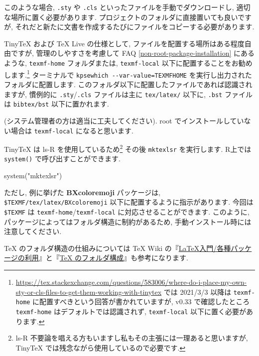 \documentclass[
  xelatex,ja=standard,jafont=noto]{bxjsreport}
\newenvironment{Shaded}{\begin{snugshade}}{\end{snugshade}}
\newcommand{\FunctionTok}[1]{\textcolor[rgb]{0.00,0.00,0.00}{#1}}
\newcommand{\NormalTok}[1]{#1}
\newcommand{\StringTok}[1]{\textcolor[rgb]{0.31,0.60,0.02}{#1}}
\begin{document}
このような場合, \texttt{.sty} や \texttt{.cls}
といったファイルを手動でダウンロードし, 適切な場所に置く必要があります.
プロジェクトのフォルダに直接置いても良いですが,
それだと新たに文書を作成するたびにファイルをコピーする必要があります.

TinyTeX および TeX Live の仕様として,
ファイルを配置する場所はある程度自由ですが, 管理のしやすさを考慮して FAQ
\ref{non-root-package-installation} にあるような, \texttt{texmf-home}
フォルダまたは, \texttt{texmf-local}
以下に配置することをお勧めします.\footnote{\url{https://tex.stackexchange.com/questions/583006/where-do-i-place-my-own-sty-or-cls-files-to-get-them-working-with-tinytex}
  では 2021/3/3 以降は \texttt{texmf-home}
  に配置すべきという回答が書かれていますが, v0.33 で確認したところ
  \texttt{texmf-home} はデフォルトでは認識されず, \texttt{texmf-local}
  以下に置く必要があります.} ターミナルで
\texttt{kpsewhich\ -\/-var-value=TEXMFHOME}
を実行し出力されたフォルダに配置します.
このフォルダ以下に配置したファイルであれば認識されますが, 慣例的に
\texttt{.sty}/\texttt{.cls} ファイルは主に \texttt{tex/latex/} 以下に,
\texttt{.bst} ファイルは \texttt{bibtex/bst} 以下に置かれます.

(システム管理者の方は適当に工夫してください). root
でインストールしていない場合は \texttt{texmf-local} になると思います.

TinyTeX は ls-R を使用しているため\footnote{ls-R
  不要論を唱える方もいますし私もその主張には一理あると思いますが,
  TinyTeX では残念ながら使用しているので必要です.} その後
\texttt{mktexlsr} を実行します. R上では \texttt{system()}
で呼び出すことができます.

\begin{Shaded}
\begin{Highlighting}[numbers=left,,]
\FunctionTok{system}\NormalTok{(}\StringTok{"mktexlsr"}\NormalTok{)}
\end{Highlighting}
\end{Shaded}

ただし, 例に挙げた \textbf{BXcoloremoji} パッケージは,
\texttt{\$TEXMF/tex/latex/BXcoloremoji}
以下に配置するように指示があります. 今回は \texttt{\$TEXMF} は
\texttt{texmf-home}/\texttt{texmf-local} に対応させることができます.
このように, パッケージによってはフォルダ構造に制約があるため,
手動インストール時には注意してください.

TeX のフォルダ構造の仕組みについては TeX Wiki
の『\href{https://texwiki.texjp.org/?LaTeX\%E5\%85\%A5\%E9\%96\%80\%2F\%E5\%90\%84\%E7\%A8\%AE\%E3\%83\%91\%E3\%83\%83\%E3\%82\%B1\%E3\%83\%BC\%E3\%82\%B8\%E3\%81\%AE\%E5\%88\%A9\%E7\%94\%A8}{LaTeX入門/各種パッケージの利用}』と『\href{https://texwiki.texjp.org/?TeX\%20\%E3\%81\%AE\%E3\%83\%87\%E3\%82\%A3\%E3\%83\%AC\%E3\%82\%AF\%E3\%83\%88\%E3\%83\%AA\%E6\%A7\%8B\%E6\%88\%90}{TeX
のフォルダ構成}』も参考になります.
\end{document}
